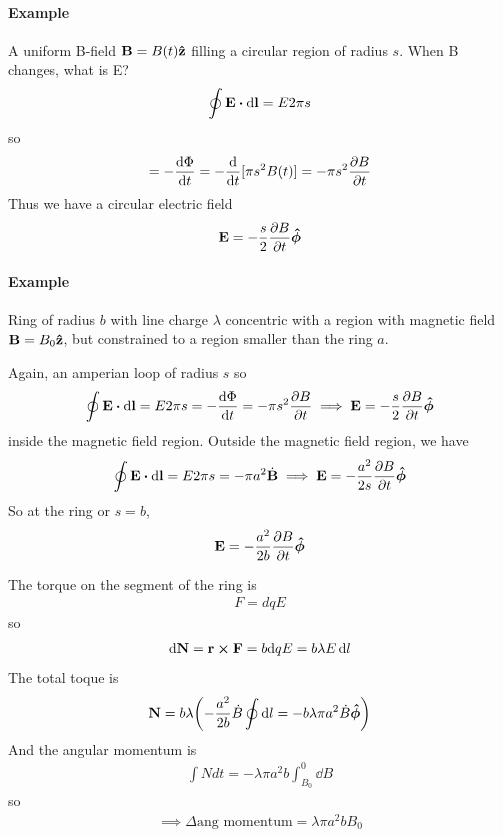 \documentclass[../main.tex]{subfiles}
\begin{document}
\paragraph{Example} A uniform B-field $\vb B = B(t) \vu z$ filling a circular region of radius $s$.
When B changes, what is E?
\begin{align*}
    \oint \vb E \vdot \dd{\vb l} = E 2\pi s
\end{align*}
so
\begin{align*}
    = -\dv{\Phi}{t} = -\dv{t}[\pi s^2 B(t)] = -\pi s^2 \pdv{B}{t}
\end{align*}
Thus we have a circular electric field
\begin{align*}
    \vb E = -\frac{s}{2} \pdv{B}{t} \vu*\phi
\end{align*}

\paragraph{Example} Ring of radius $b$ with line charge $\lambda$ concentric with a region with magnetic field $\vb B = B_0 \vu z$,
but constrained to a region smaller than the ring $a$.

Again, an amperian loop of radius $s$ so
\begin{align*}
    \oint \vb E \vdot \dd{\vb l} = E 2\pi s = -\dv{\Phi}{t} = -\pi s^2 \pdv{B}{t} \implies \vb E = -\frac{s}{2} \pdv{B}{t} \vu*\phi
\end{align*}
inside the magnetic field region. Outside the magnetic field region, we have
\begin{align*}
    \oint \vb E \vdot \dd{\vb l} = E 2\pi s = -\pi a^2 \dot{\vb B} \implies \vb E = -\frac{a^2}{2s} \pdv{B}{t} \vu*\phi
\end{align*}
So at the ring or $s = b$,
\begin{align*}
    \vb E = -\frac{a^2}{2b} \pdv{B}{t} \vu*\phi
\end{align*}

The torque on the segment of the ring is 
\begin{align*}
    F = dq E
\end{align*}
so
\begin{align*}
    \dd \vb N = \vb r \cross \vb F = b \dd q E = b \lambda E \dd{l}
\end{align*}
The total toque is
\begin{align*}
    \vb N = b \lambda \qt(
        - \frac{a^2}{2b} \dot{B} \oint \dd{l} = - b \lambda \pi a^2 \dot{B} \vu*\phi
    )
\end{align*}
And the angular momentum is
\begin{align*}
    \int N dt = -\lambda \pi a^2 b \int_{B_0}^0 \dd{B}
\end{align*}
so
\begin{align*}
    \implies \Delta \textrm{ang momentum} = \lambda \pi a^2 b B_0
\end{align*}
\end{document}
